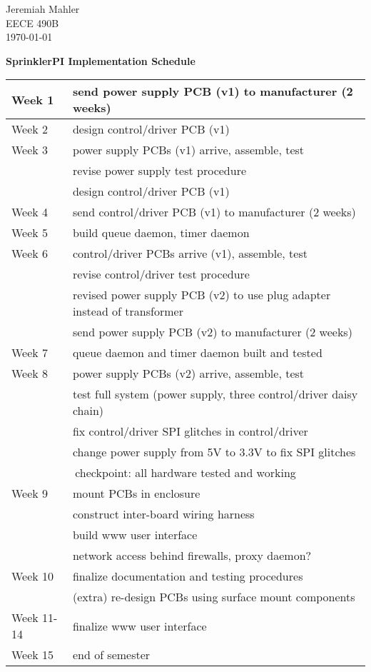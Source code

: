 \documentclass{article}
\begin{document}
\thispagestyle{empty}

Jeremiah Mahler \\
EECE 490B \\
\today

\vspace{0.25in}

\begin{center}
\textbf{\large SprinklerPI Implementation Schedule}
{\renewcommand{\arraystretch}{1.5}%
\begin{tabular}{|l|l|}
\hline
Week 1 & send power supply PCB (v1) to manufacturer (2 weeks) \\
\hline
Week 2 	& design control/driver PCB (v1) \\
\hline
Week 3 	& power supply PCBs (v1) arrive, assemble, test \\
		& revise power supply test procedure \\
		& design control/driver PCB (v1) \\
\hline
Week 4	& send control/driver PCB (v1) to manufacturer (2 weeks) \\
\hline
Week 5  & build queue daemon, timer daemon \\
\hline
Week 6  & control/driver PCBs arrive (v1), assemble, test \\
		& revise control/driver test procedure \\
		& revised power supply PCB (v2) to use plug adapter instead
				of transformer \\
		& send power supply PCB (v2) to manufacturer (2 weeks) \\
\hline
Week 7 	& queue daemon and timer daemon built and tested \\
\hline
Week 8 	& power supply PCBs (v2) arrive, assemble, test \\
		& test full system (power supply, three control/driver daisy chain) \\
		& fix control/driver SPI glitches in control/driver \\
		& change power supply from 5V to 3.3V to fix SPI glitches \\
\hline
\multicolumn{2}{|c|}{checkpoint: all hardware tested and working} \\
\hline
Week 9	& mount PCBs in enclosure \\
		& construct inter-board wiring harness \\
		& build www user interface \\
		& network access behind firewalls, proxy daemon? \\
\hline
Week 10	& finalize documentation and testing procedures \\
		& (extra) re-design PCBs using surface mount components \\
\hline
Week 11-14	& finalize www user interface \\
\hline
Week 15 & end of semester \\
\hline
\end{tabular}
}
\end{center}
\end{document}
